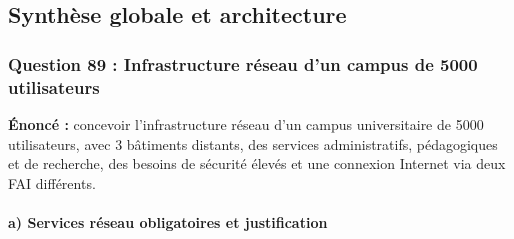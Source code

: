 \documentclass[12pt,a4paper]{article}
\begin{document}
\subsection{Synthèse globale et architecture}


\subsubsection*{Question 89 : Infrastructure réseau d'un campus de 5000 utilisateurs}

\textbf{Énoncé :} concevoir l'infrastructure réseau d'un campus
universitaire de 5000 utilisateurs, avec 3 bâtiments distants, des
services administratifs, pédagogiques et de recherche, des besoins de
sécurité élevés et une connexion Internet via deux FAI différents.

\paragraph{a) Services réseau obligatoires et justification}
\end{document}
